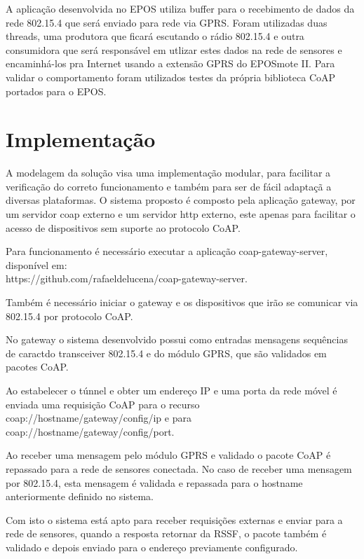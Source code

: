 A aplica\c{c}\~ao desenvolvida no EPOS utiliza buffer para o recebimento de dados da rede 802.15.4 que ser\'a enviado para rede via GPRS. Foram utilizadas duas threads, uma produtora que ficar\'a escutando o r\'adio 802.15.4 e outra consumidora que ser\'a respons\'avel em utlizar estes dados na rede de sensores e encaminh\'a-los pra Internet usando a extens\~ao GPRS do EPOSmote II. Para validar o comportamento foram utilizados testes da pr\'opria biblioteca CoAP portados para o EPOS.

\section{Implementa\c{c}\~ao}

A modelagem da solu\c{c}\~ao visa uma implementa\c{c}\~ao modular, para facilitar a verifica\c{c}\~ao do correto funcionamento e tamb\'em para ser de f\'acil adapta\c{c}\~a a diversas plataformas. O sistema proposto \'e composto pela aplica\c{c}\~ao gateway, por um servidor coap externo e um servidor http externo, este apenas para facilitar o acesso de dispositivos sem suporte ao protocolo CoAP.

Para funcionamento \'e necess\'ario executar a aplica\c{c}\~ao coap-gateway-server, dispon\'ivel em:\\https://github.com/rafaeldelucena/coap-gateway-server.

Tamb\'em \'e necess\'ario iniciar o gateway e os dispositivos que ir\~ao se comunicar via 802.15.4 por protocolo CoAP.

No gateway o sistema desenvolvido possui como entradas mensagens sequ\^encias de caract\eres do transceiver 802.15.4 e do m\'odulo GPRS, que s\~ao validados em pacotes CoAP.

Ao estabelecer o t\'unnel e obter um endere\c{c}o IP e uma porta da rede m\'ovel \'e enviada uma requisi\c{c}\~ao CoAP para o recurso\\ coap://hostname/gateway/config/ip e para\\ coap://hostname/gateway/config/port.

Ao receber uma mensagem pelo m\'odulo GPRS e validado o pacote CoAP \'e repassado para a rede de sensores conectada.  No caso de receber uma mensagem por 802.15.4, esta mensagem \'e validada e repassada para o hostname anteriormente definido no sistema. 

Com isto o sistema est\'a apto para receber requisi\c{c}\~oes externas e enviar para a rede de sensores, quando a resposta retornar da RSSF, o pacote tamb\'em \'e validado e depois enviado para o endere\c{c}o previamente configurado.

